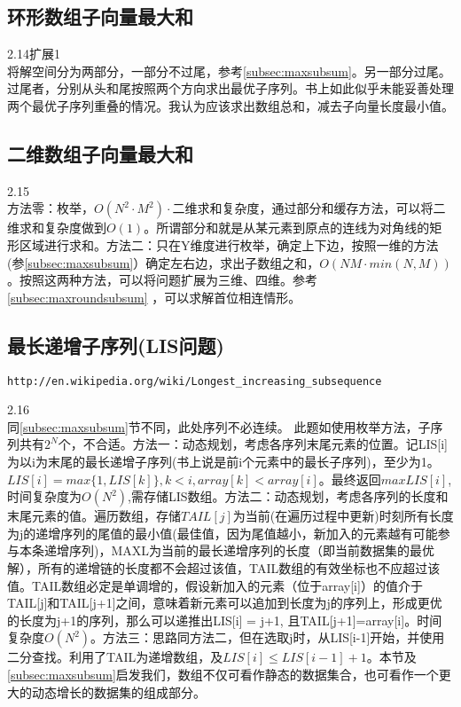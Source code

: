 \subsection{环形数组子向量最大和}
\cite{bop}2.14扩展1\\
将解空间分为两部分，一部分不过尾，参考\ref{subsec:maxsubsum}。另一部分过尾。过尾者，分别从头和尾按照两个方向求出最优子序列。书上如此似乎未能妥善处理两个最优子序列重叠的情况。我认为应该求出数组总和，减去子向量长度最小值。

\label{subsec:maxroundsubsum}

\subsection{二维数组子向量最大和}
\cite{bop}2.15\\
方法零：枚举，$O(N^2 \cdot M^2) \cdot \textrm{二维求和复杂度}$，通过部分和缓存方法，可以将二维求和复杂度做到$O(1)$。所谓部分和就是从某元素到原点的连线为对角线的矩形区域进行求和。方法二：只在Y维度进行枚举，确定上下边，按照一维的方法(参\ref{subsec:maxsubsum}）确定左右边，求出子数组之和，$O(NM \cdot min(N,M))$。按照这两种方法，可以将问题扩展为三维、四维。参考\ref{subsec:maxroundsubsum} ，可以求解首位相连情形。


\subsection{最长递增子序列(LIS问题)}
\begin{verbatim}
http://en.wikipedia.org/wiki/Longest_increasing_subsequence
\end{verbatim}
\cite{bop}2.16\\
同\ref{subsec:maxsubsum}节不同，此处序列不必连续。
此题如使用枚举方法，子序列共有$2^N$个，不合适。方法一：动态规划，考虑各序列末尾元素的位置。记LIS[i]为以i为末尾的最长递增子序列(书上说是前i个元素中的最长子序列)，至少为1。$LIS[i]=max\{1,LIS[k]\}, k<i, array[k]<array[i]$。最终返回$max{LIS[i]}$,时间复杂度为$O(N^2)$,需存储LIS数组。方法二：动态规划，考虑各序列的长度和末尾元素的值。遍历数组，存储$TAIL[j]$为当前(在遍历过程中更新)时刻所有长度为j的递增序列的尾值的最小值(最佳值，因为尾值越小，新加入的元素越有可能参与本条递增序列)，MAXL为当前的最长递增序列的长度（即当前数据集的最优解），所有的递增链的长度都不会超过该值，TAIL数组的有效坐标也不应超过该值。TAIL数组必定是单调增的，假设新加入的元素（位于array[i]）的值介于TAIL[j]和TAIL[j+1]之间，意味着新元素可以追加到长度为j的序列上，形成更优的长度为j+1的序列，那么可以递推出LIS[i] = j+1, 且TAIL[j+1]=array[i]。时间复杂度$O(N^2)$。方法三：思路同方法二，但在选取j时，从LIS[i-1]开始，并使用二分查找。利用了TAIL为递增数组，及$LIS[i] \le LIS[i-1]+1$。本节及\ref{subsec:maxsubsum}启发我们，数组不仅可看作静态的数据集合，也可看作一个更大的动态增长的数据集的组成部分。

